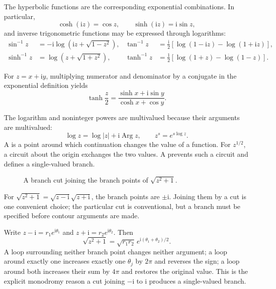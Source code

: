 The hyperbolic functions are the corresponding exponential combinations. In particular,
\begin{equation}
\cosh(\mathrm{i}z)=\cos z,\qquad \sinh(\mathrm{i}z)=\mathrm{i}\sin z,
\end{equation}
and inverse trigonometric functions may be expressed through logarithms:
\begin{align}
\sin^{-1}z&=-\mathrm{i}\log\left(\mathrm{i}z+\sqrt{1-z^2}\right),&
\tan^{-1}z&=\frac{\mathrm{i}}{2}\left[\log(1-\mathrm{i}z)-\log(1+\mathrm{i}z)\right],\\
\sinh^{-1}z&=\log\left(z+\sqrt{1+z^2}\right),&
\tanh^{-1}z&=\frac12\left[\log(1+z)-\log(1-z)\right].
\end{align}

\begin{example}
For $z=x+\mathrm{i}y$, multiplying numerator and denominator by a conjugate in the exponential definition yields
\begin{equation}
\tanh\frac{z}{2}=\frac{\sinh x+\mathrm{i}\sin y}{\cosh x+\cos y}.
\end{equation}
\end{example}

The logarithm and noninteger powers are multivalued because their arguments are multivalued:
\begin{equation}
\log z=\log|z|+\mathrm{i}\operatorname{Arg}z,
\qquad z^s=e^{s\log z}.
\end{equation}
A  is a point around which continuation changes the value of a function. For $z^{1/2}$, a circuit about the origin exchanges the two values. A  prevents such a circuit and defines a single-valued branch.

\begin{figure}[htb]
    \centering
    \caption{A branch cut joining the branch points of $\sqrt{z^2+1}$.}
    \label{fig:ch06-branch-cut}
\end{figure}

For $\sqrt{z^2+1}=\sqrt{z-\mathrm{i}}\sqrt{z+\mathrm{i}}$, the branch points are $\pm\mathrm{i}$. Joining them by a cut is one convenient choice; the particular cut is conventional, but a branch must be specified before contour arguments are made.

Write $z-\mathrm{i}=r_1e^{\mathrm{i}\theta_1}$ and $z+\mathrm{i}=r_2e^{\mathrm{i}\theta_2}$. Then
\begin{equation}
\sqrt{z^2+1}=\sqrt{r_1r_2}\,e^{\mathrm{i}(\theta_1+\theta_2)/2}.
\end{equation}
A loop surrounding neither branch point changes neither argument; a loop around exactly one increases exactly one $\theta_j$ by $2\pi$ and reverses the sign; a loop around both increases their sum by $4\pi$ and restores the original value. This is the explicit monodromy reason a cut joining $-\mathrm{i}$ to $\mathrm{i}$ produces a single-valued branch.